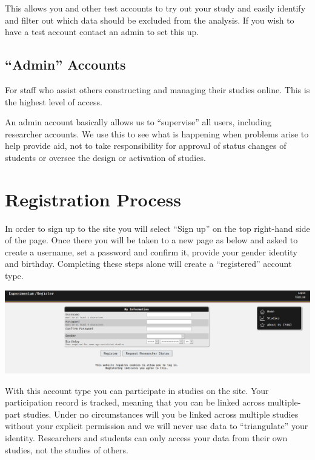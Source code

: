 \documentclass[]{book}
\begin{document}
This allows you and other test accounts to try out your study and easily
identify and filter out which data should be excluded from the analysis.
If you wish to have a test account contact an admin to set this up.

\subsection{\texorpdfstring{``Admin''
Accounts}{Admin Accounts}}\label{admin-accounts}

For staff who assist others constructing and managing their studies
online. This is the highest level of access.

An admin account basically allows us to ``supervise'' all users,
including researcher accounts. We use this to see what is happening when
problems arise to help provide aid, not to take responsibility for
approval of status changes of students or oversee the design or
activation of studies.

\section{Registration Process}\label{registration-process}

In order to sign up to the site you will select ``Sign up'' on the top
right-hand side of the page. Once there you will be taken to a new page
as below and asked to create a username, set a password and confirm it,
provide your gender identity and birthday. Completing these steps alone
will create a ``registered'' account type.

\includegraphics{images/screenshots/register.png}

With this account type you can participate in studies on the site. Your
participation record is tracked, meaning that you can be linked across
multiple-part studies. Under no circumstances will you be linked across
multiple studies without your explicit permission and we will never use
data to ``triangulate'' your identity. Researchers and students can only
access your data from their own studies, not the studies of others.
\end{document}

